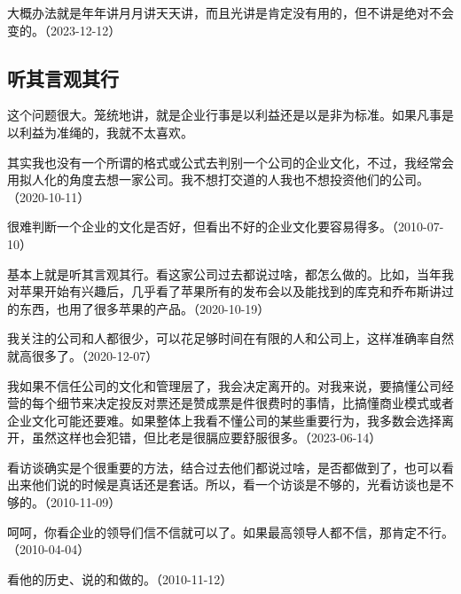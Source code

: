 
大概办法就是年年讲月月讲天天讲，而且光讲是肯定没有用的，但不讲是绝对不会变的。（2023-12-12）

\subsection{听其言观其行}


这个问题很大。笼统地讲，就是企业行事是以利益还是以是非为标准。如果凡事是以利益为准绳的，我就不太喜欢。

其实我也没有一个所谓的格式或公式去判别一个公司的企业文化，不过，我经常会用拟人化的角度去想一家公司。我不想打交道的人我也不想投资他们的公司。（2020-10-11）

很难判断一个企业的文化是否好，但看出不好的企业文化要容易得多。（2010-07-10）

基本上就是听其言观其行。看这家公司过去都说过啥，都怎么做的。比如，当年我对苹果开始有兴趣后，几乎看了苹果所有的发布会以及能找到的库克和乔布斯讲过的东西，也用了很多苹果的产品。（2020-10-19）

我关注的公司和人都很少，可以花足够时间在有限的人和公司上，这样准确率自然就高很多了。（2020-12-07）

我如果不信任公司的文化和管理层了，我会决定离开的。对我来说，要搞懂公司经营的每个细节来决定投反对票还是赞成票是件很费时的事情，比搞懂商业模式或者企业文化可能还要难。如果整体上我看不懂公司的某些重要行为，我多数会选择离开，虽然这样也会犯错，但比老是很膈应要舒服很多。（2023-06-14）


看访谈确实是个很重要的方法，结合过去他们都说过啥，是否都做到了，也可以看出来他们说的时候是真话还是套话。所以，看一个访谈是不够的，光看访谈也是不够的。（2010-11-09）


呵呵，你看企业的领导们信不信就可以了。如果最高领导人都不信，那肯定不行。（2010-04-04）


看他的历史、说的和做的。（2010-11-12）



